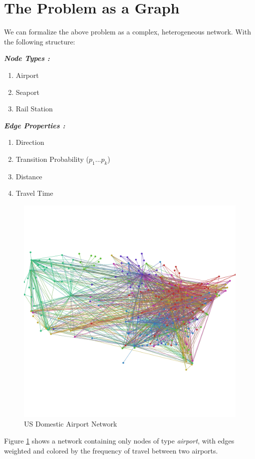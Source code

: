 \section{The Problem as a Graph}\label{sec:asgraph-\myInitials}


We can formalize the above problem as a complex, heterogeneous network. With the following structure:

\begin{center}
    \parbox[t]{2.4in}{
        \raggedright%
        \textbf{\textit{Node Types :}}
        \begin{enumerate}[topsep=0pt,itemsep=-2pt,leftmargin=13pt]
            \item Airport
            \item Seaport
            \item Rail Station
        \end{enumerate}
    }%
    \parbox[t]{2.4in}{
        \raggedright%
        \textbf{\textit{Edge Properties :}}
        \begin{enumerate}[topsep=0pt,itemsep=-2pt,leftmargin=13pt]
            \item Direction
            \item Transition Probability ($p_1...p_k$)
            \item Distance
            \item Travel Time
        \end{enumerate}
    }
\end{center}

\begin{figure}
    \centering
    \includegraphics[width=1.0\textwidth]{figures-RW/usairport_base.png}
    \caption{US Domestic Airport Network\cite{stanford_dhs}}
    \label{fig:us_domestic}
\end{figure}

\newpage
Figure \ref{fig:us_domestic} shows a network containing only nodes of type \textit{airport}, with edges weighted and colored by the frequency of travel between two airports.

